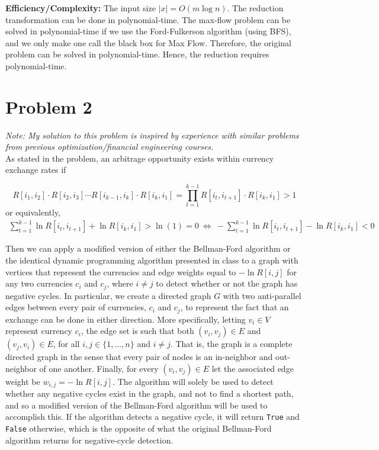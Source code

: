 \documentclass[twoside,11pt]{homework}
\begin{document}
\begin{enumerate}[\bf (i.)]
\noindent
\textbf{Efficiency/Complexity:} The input size $|x| = O(m \log n)$.  The reduction transformation can be done in polynomial-time.  The max-flow problem can be solved in polynomial-time if we use the Ford-Fulkerson algorithm (using BFS),  and we only make one call the black box for Max Flow.  Therefore,  the original problem can be solved in polynomial-time.  Hence, the reduction requires polynomial-time.


\end{enumerate}





\section*{Problem 2}
\textit{Note: My solution to this problem is inspired by experience with similar problems from previous optimization/financial engineering courses.}  \\[0.3em]

\noindent
As stated in the problem,  an arbitrage opportunity exists within currency exchange rates if  

$$R[i_1, i_2] \cdot R[i_2, i_3] \cdots R[i_{k-1}, i_k] \cdot R[i_k, i_1]  =  \prod_{t =1}^{k-1} R[i_t , i_{t+1}] \cdot R[i_k , i_1] > 1$$
or equivalently, 
\begin{align*}
\sum_{t =1}^{k-1} \ln R[i_t , i_{t+1}] + \ln R[i_k , i_1] > \ln (1) = 0  \ \Longleftrightarrow \ - \sum_{t =1}^{k-1} \ln R[i_t , i_{t+1}] - \ln R[i_k , i_1] < 0 
\end{align*}

\noindent
Then we can apply a modified version of either the Bellman-Ford algorithm or the identical dynamic programming algorithm presented in class to a graph with vertices that represent the currencies and edge weights equal to $- \ln R[i, j]$ for any two currencies $c_i$ and $c_j$, where $i \neq j$ to detect whether or not the graph has negative cycles.  In particular,  we create a directed graph $G$ with two anti-parallel edges between every pair of currencies, $c_i$ and $c_j$,  to represent the fact that an exchange can be done in either direction.  More specifically,  letting $v_i \in V$ represent currency $c_i$,  the edge set is such that both $(v_i,  v_j) \in E$ and $(v_j, v_i) \in E$,  for all $i, j \in \{1, \dots, n \}$ and $i \neq j$.  That is,  the graph is a complete directed graph in the sense that every pair of nodes is an in-neighbor and out-neighbor of one another.  Finally,  for every $(v_i,  v_j) \in E$ let the associated edge weight be $w_{i,j} = - \ln R[i, j]$.  The algorithm will solely be used to detect whether any negative cycles exist in the graph,  and not to find a shortest path, and so a modified version of the Bellman-Ford algorithm will be used to accomplish this.  If the algorithm detects a negative cycle, it will return \texttt{True} and \texttt{False} otherwise,  which is the opposite of what the original Bellman-Ford algorithm returns for negative-cycle detection.  \\
\end{document}
